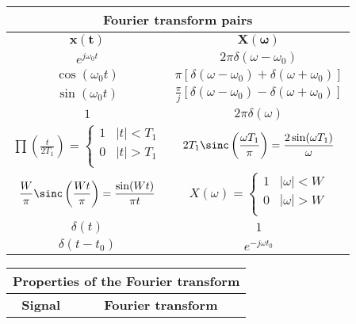 \documentclass[12pt,es,blanco]{uah}
\begin{document}
\begin{center}
    \renewcommand{\arraystretch}{1.5}
    \begin{tabular}{|c|c|}
        \multicolumn{2}{c}{{\bf Fourier transform pairs }} \\
        \hline
        $\mathbf{x(t)}$ & $\mathbf{X(\omega)}$ \\
        \hline
        $e^{j\omega_0 t }$ & $2\pi\delta (\omega-\omega_0)$ \\
        \hline
        $\cos(\omega_0 t)$ & $\pi \left [ \delta(\omega-\omega_0 ) + \delta(\omega+\omega_0 ) \right ]$\\
        \hline
        $\sin(\omega_0 t)$ & $\displaystyle\frac{\pi}{j} \left [ \delta(\omega-\omega_0 ) - \delta(\omega+\omega_0 ) \right ]$\\
        \hline
        $1$ & $2\pi\delta(\omega)$ \\
        \hline
        $\prod \left ( \displaystyle\frac{t}{2T_1}\right ) = \left \{ \begin{array}{lc} 1 & |t| < T_1 \\ 0 & |t| >T_1 \\ \end{array} \right.$ & $2 T_1 \sinc\left ( \displaystyle\frac{\omega T_1}{\pi} \right ) = \displaystyle\frac{2 \sin(\omega T_1)}{\omega}$ \\
        \hline 
        $\displaystyle\frac{W}{\pi} \sinc\left ( \displaystyle\frac{Wt}{\pi} \right ) = \displaystyle\frac{\sin(Wt)}{\pi t}$ & $X(\omega) = \left \{ \begin{array}{lc} 1 & |\omega| < W \\ 0 & |\omega| >W \\ \end{array} \right. $ \\ 
        \hline 
        $\delta(t)$ & $1$ \\
        \hline
        $\delta(t-t_0)$ & $e^{-j \omega t_0}$ \\
        \hline
    \end{tabular}
    \renewcommand{\arraystretch}{1}
    \vspace{0.5cm}
    \renewcommand{\arraystretch}{1.5}
    \begin{tabular}{|c|c|}
        \multicolumn{2}{c}{{\bf Properties of the Fourier transform }} \\
        \hline
        {\bf Signal} & {\bf Fourier transform} \\
        \hline

\end{tabular}
\end{center}
\end{document}

